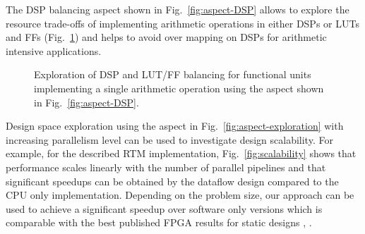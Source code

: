 The DSP balancing aspect shown in Fig.~\ref{fig:aspect-DSP} allows to
explore the resource trade-offs of implementing arithmetic operations
in either DSPs or LUTs and FFs (Fig.~\ref{fig:arith}) and helps to
avoid over mapping on DSPs for arithmetic intensive applications.

\begin{figure}[!h]
  \centering
  \hspace{-2cm}
  \caption{Exploration of DSP and LUT/FF balancing for functional units
    implementing a single arithmetic operation using the aspect shown
    in Fig.~\ref{fig:aspect-DSP}.}
  \label{fig:arith}
\end{figure}

Design space exploration using the aspect in
Fig.~\ref{fig:aspect-exploration} with increasing parallelism level
can be used to investigate design scalability. For example, for the
described RTM implementation, Fig.~\ref{fig:scalability} shows that
performance scales linearly with the number of parallel pipelines and
that significant speedups can be obtained by the \FAST{} dataflow
design compared to the CPU only implementation. Depending on the
problem size, our approach can be used to achieve a significant
speedup over software only versions which is comparable with the best
published FPGA results for static designs
\cite{Xinyu:Qiwei:Luk:Qiang:Pell:2012}, \cite{araya2011assessing}.


